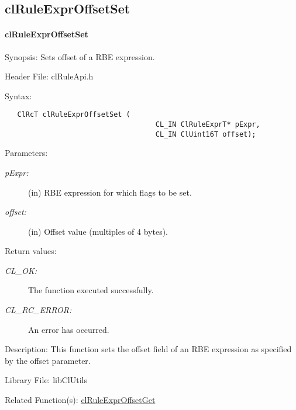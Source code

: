 \begin{flushleft}
\subsection{clRuleExprOffsetSet}
\hypertarget{pagerule110}{}\paragraph{cl\-Rule\-Expr\-Offset\-Set}\label{pagerule110}
\begin{Desc}
\item[Synopsis:]Sets offset of a RBE expression.\end{Desc}
\begin{Desc}
\item[Header File:]clRuleApi.h\end{Desc}
\begin{Desc}
\item[Syntax:]

\footnotesize\begin{verbatim}   ClRcT clRuleExprOffsetSet (
                              		CL_IN ClRuleExprT* pExpr,
                              		CL_IN ClUint16T offset);
\end{verbatim}
\normalsize
\end{Desc}
\begin{Desc}
\item[Parameters:]
\begin{description}
\item[{\em p\-Expr:}](in) RBE expression for which flags to be set. \item[{\em offset:}](in) Offset value (multiples of 4 bytes).\end{description}
\end{Desc}
\begin{Desc}
\item[Return values:]
\begin{description}
\item[{\em CL\_\-OK:}]The function executed successfully. \item[{\em CL\_\-RC\_\-ERROR:}]An error has occurred.\end{description}
\end{Desc}
\begin{Desc}
\item[Description:]This function sets the offset field of an RBE expression as specified by the offset parameter.\end{Desc}
\begin{Desc}
\item[Library File:]lib\-Cl\-Utils\end{Desc}
\begin{Desc}
\item[Related Function(s):]\hyperlink{pagerule114}{cl\-Rule\-Expr\-Offset\-Get} \end{Desc}
\newpage


\end{flushleft}
